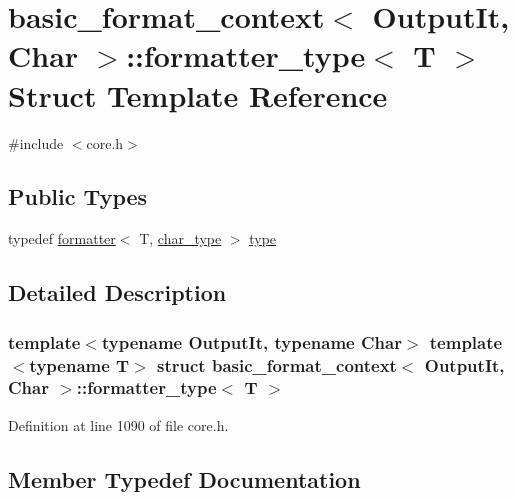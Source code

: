 \hypertarget{structbasic__format__context_1_1formatter__type}{}\section{basic\+\_\+format\+\_\+context$<$ Output\+It, Char $>$\+:\+:formatter\+\_\+type$<$ T $>$ Struct Template Reference}
\label{structbasic__format__context_1_1formatter__type}


{\ttfamily \#include $<$core.\+h$>$}

\subsection*{Public Types}
\begin{DoxyCompactItemize}
\item 
typedef \hyperlink{structformatter}{formatter}$<$ T, \hyperlink{classbasic__format__context_ab6b3447e996c0b8117e4f6d98d4e1597}{char\+\_\+type} $>$ \hyperlink{structbasic__format__context_1_1formatter__type_a0d7d26df97530fd48ac910bab66b77d0}{type}
\end{DoxyCompactItemize}


\subsection{Detailed Description}
\subsubsection*{template$<$typename Output\+It, typename Char$>$\newline
template$<$typename T$>$\newline
struct basic\+\_\+format\+\_\+context$<$ Output\+It, Char $>$\+::formatter\+\_\+type$<$ T $>$}



Definition at line 1090 of file core.\+h.



\subsection{Member Typedef Documentation}
\mbox{\label{structbasic__format__context_1_1formatter__type_a0d7d26df97530fd48ac910bab66b77d0}} 
